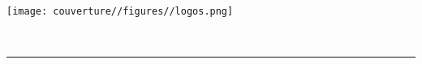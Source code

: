 \thispagestyle{empty}
\pagecolor{bleu}\afterpage{\nopagecolor}

\begin{center}
\texttt{[image: couverture//figures//logos.png]}	%
\end{center}

\vspace{3cm}
\begin{center}
{\huge \color{white} \sf \titre}
\vspace{2cm}
\\ {\color{white} \sf \Large  \auteur}

\vspace{4cm}
\begin{center}
{\color{white} \noindent\rule{2cm}{0.4pt}}
\end{center}
\vspace{1cm}
{\color{white} \sf \Large  \promoteur}
\vspace{1cm}
\\ {\color{white} \sf  \small  \master}
\\ {\color{white} \sf  \small  \annee}
\pagebreak

\end{center}